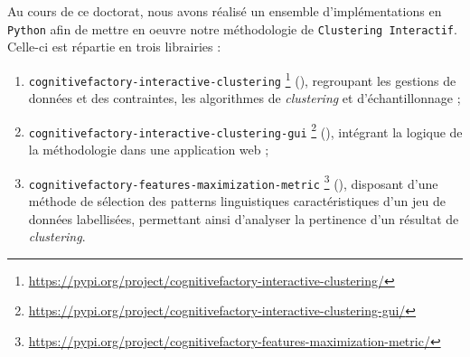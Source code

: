 \label{annex:C-ANNEXE-IMPLEMENTATIONS}

	Au cours de ce doctorat, nous avons réalisé un ensemble d'implémentations en \texttt{Python} afin de mettre en oeuvre notre méthodologie de \texttt{Clustering Interactif}.
	Celle-ci est répartie en trois librairies :
	\begin{enumerate}
		\item \texttt{cognitivefactory-interactive-clustering} \footnote{
			\url{https://pypi.org/project/cognitivefactory-interactive-clustering/}
		} (\cite{schild:2022:cognitivefactory-interactiveclustering}), regroupant les gestions de données et des contraintes, les algorithmes de \textit{clustering} et d'échantillonnage ;
		\item \texttt{cognitivefactory-interactive-clustering-gui} \footnote{
			\url{https://pypi.org/project/cognitivefactory-interactive-clustering-gui/}
		} (\cite{schild-etal:2022:cognitivefactory-interactiveclusteringgui}), intégrant la logique de la méthodologie dans une application web ;
		\item \texttt{cognitivefactory-features-maximization-metric} \footnote{
			\url{https://pypi.org/project/cognitivefactory-features-maximization-metric/}
		} (\cite{schild:2023:cognitivefactory-featuresmaximizationmetric}), disposant d'une méthode de sélection des patterns linguistiques caractéristiques d'un jeu de données labellisées, permettant ainsi d'analyser la pertinence d'un résultat de \textit{clustering}.
	\end{enumerate}
	
